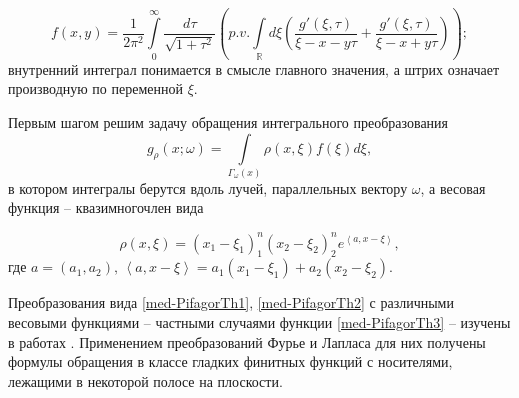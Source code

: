 $$f(x,y)=\frac{1}{2\pi^2}\int\limits_0^\infty\frac{d\tau}{\sqrt{1+\tau^2}}\left(p.v.\int\limits_\mathbb R d\xi\left( \frac{g'(\xi,\tau)}{\xi-x-y\tau}+\frac{g'(\xi,\tau)}{\xi-x+y\tau}\right)\right);$$
внутренний интеграл понимается в смысле главного значения, а штрих означает производную по переменной $\xi$.

Первым шагом решим задачу обращения интегрального преобразования
\begin{equation}
	\label{med-PifagorTh2}
	g_\rho(x;\omega)=\int\limits_{\Gamma_\omega(x)}\rho(x,\xi)f(\xi)d\xi,\end{equation}
в котором интегралы берутся вдоль лучей, параллельных вектору $\omega$, а весовая функция -- квазимногочлен вида

\begin{equation}
	\label{med-PifagorTh3}
	\rho(x,\xi)=(x_1-\xi_1)^n_1(x_2-\xi_2)^n_2e^{\left<a,x-\xi\right>},\end{equation}
где $a=(a_1,a_2), \, \left<a,x-\xi\right>=a_1(x_1-\xi_1)+a_2(x_2-\xi_2)$.

Преобразования вида \eqref{med-PifagorTh1}, \eqref{med-PifagorTh2} с различными весовыми функциями -- частными случаями функции \eqref{med-PifagorTh3} -- изучены в работах \cite{med-metka5, med-metka6}. Применением преобразований Фурье и Лапласа для них получены формулы обращения в классе гладких финитных функций с носителями, лежащими в некоторой полосе на плоскости.














